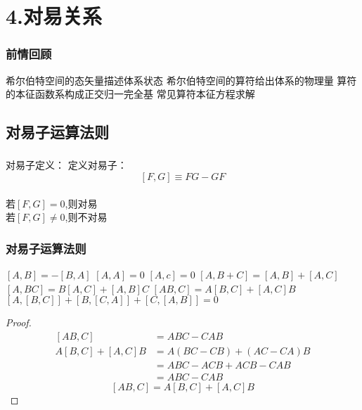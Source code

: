 

\section{4.对易关系}

\begin{frame}
    \frametitle{前情回顾}
    \begin{itemize}
        \Item 希尔伯特空间的态矢量描述体系状态
        \Item 希尔伯特空间的算符给出体系的物理量
        \Item 算符的本征函数系构成正交归一完全基
        \Item 常见算符本征方程求解
    \end{itemize}   
\end{frame} 

\subsection{对易子运算法则}

\begin{frame} 
    \frametitle{}
    \begin{tcolorbox1}{对易子定义：}
        定义对易子：$$ [F,G]\equiv FG-GF $$ \\
        若$[F,G]=0$,则对易 \\
        若$[F,G]\neq0$,则不对易  
    \end{tcolorbox1}
\end{frame} 

\begin{frame} 
    \frametitle{对易子运算法则}
    \begin{enumerate}
        \Item  $[A,B]=-[B,A]$
        \Item  $[A,A]=0$
        \Item  $[A,c]=0$
        \Item  $[A,B+C]=[A,B]+[A,C]$
        \Item  $[A,BC]=B[A,C]+[A,B]C$
        \Item  $[AB,C]=A[B,C]+[A,C]B$
        \Item  $[A,[B,C]] + [B,[C,A]] + [C,[A,B]] =0$
    \end{enumerate}
\end{frame} 
\begin{frame}
    \begin{proof}{}   
        \begin{equation*}
            \begin{split} 
            [AB,C]&=ABC-CAB \\
            A[B,C]+[A,C]B&=A(BC-CB)+(AC-CA)B\\
            &=ABC-ACB+ACB-CAB\\
            &=ABC-CAB
            \end{split}  
        \end{equation*}  
        $$ [AB,C]=A[B,C]+[A,C]B $$
    \end{proof}
\end{frame} 

